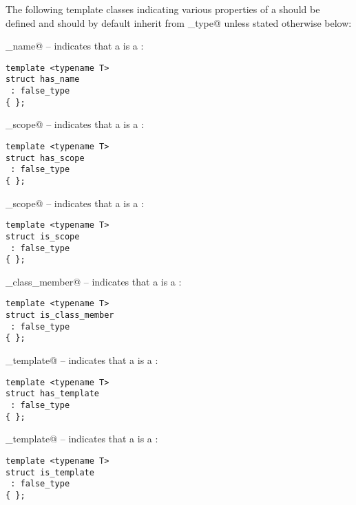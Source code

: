 The following template classes indicating various properties of a 
should be defined and should by default inherit from \verb@false_type@ unless stated
otherwise below:

\verb@has_name@ -- indicates that a  is a :
\begin{lstlisting}
template <typename T>
struct has_name
 : false_type
{ };
\end{lstlisting}

\verb@has_scope@ -- indicates that a  is a :
\begin{lstlisting}
template <typename T>
struct has_scope
 : false_type
{ };
\end{lstlisting}

\verb@is_scope@ -- indicates that a  is a :
\begin{lstlisting}
template <typename T>
struct is_scope
 : false_type
{ };
\end{lstlisting}

\verb@is_class_member@ -- indicates that a  is a :
\begin{lstlisting}
template <typename T>
struct is_class_member
 : false_type
{ };
\end{lstlisting}

\verb@has_template@ -- indicates that a  is a :
\begin{lstlisting}
template <typename T>
struct has_template
 : false_type
{ };
\end{lstlisting}

\verb@is_template@ -- indicates that a  is a :
\begin{lstlisting}
template <typename T>
struct is_template
 : false_type
{ };
\end{lstlisting}

